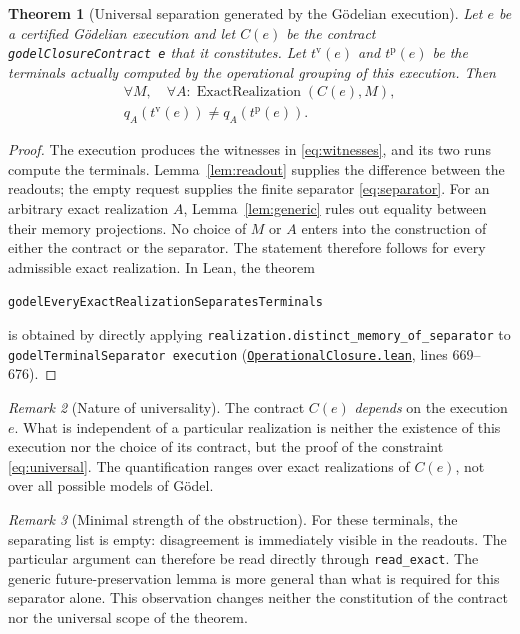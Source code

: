\documentclass[11pt,a4paper]{article}
\newcommand{\ExactRealization}{\operatorname{ExactRealization}}
\newcommand{\code}[1]{\nolinkurl{#1}}
\newcommand{\SourceAt}[3]{\href{https://github.com/JohnDoe-collab-stack/relational-perimeter/blob/1e5aeda745559d62a3819bb3213da7fce3c31ad1/#1\#L#2}{\nolinkurl{#3}}}
\newtheorem{theorem}{Theorem}[section]
\theoremstyle{remark}
\newtheorem{remark}[theorem]{Remark}
\begin{document}
\begin{theorem}[Universal separation generated by the Gödelian execution]
\label{thm:universal}
Let $e$ be a certified Gödelian execution and let $C(e)$ be the contract
\code{godelClosureContract e} that it constitutes. Let
$t^{\mathrm v}(e)$ and $t^{\mathrm p}(e)$ be the terminals actually
computed by the operational grouping of this execution. Then
\begin{equation}\label{eq:universal}
\boxed{\begin{gathered}
\forall M,\quad \forall A:\ExactRealization(C(e),M),\\
q_A(t^{\mathrm v}(e))\neq q_A(t^{\mathrm p}(e)).
\end{gathered}}
\end{equation}
\end{theorem}
\begin{proof}
The execution produces the witnesses in \eqref{eq:witnesses}, and its two
runs compute the terminals. Lemma~\ref{lem:readout} supplies the difference
between the readouts; the empty request supplies the finite separator
\eqref{eq:separator}. For an arbitrary exact realization $A$,
Lemma~\ref{lem:generic} rules out equality between their memory projections.
No choice of $M$ or $A$ enters into the construction of either the contract
or the separator. The statement therefore follows for every admissible
exact realization. In Lean, the theorem
\begin{center}
\code{godelEveryExactRealizationSeparatesTerminals}
\end{center}
is obtained by directly applying
\code{realization.distinct\_memory\_of\_separator} to
\code{godelTerminalSeparator execution}
(\SourceAt{RelationalPerimeter/Constitution/Godel/OperationalClosure.lean}{669-L676}{OperationalClosure.lean},
lines 669--676).
\end{proof}

\begin{remark}[Nature of universality]
The contract $C(e)$ \emph{depends} on the execution $e$. What is independent
of a particular realization is neither the existence of this execution nor
the choice of its contract, but the proof of the constraint
\eqref{eq:universal}. The quantification ranges over exact realizations of
$C(e)$, not over all possible models of Gödel.
\end{remark}

\begin{remark}[Minimal strength of the obstruction]
For these terminals, the separating list is empty: disagreement is
immediately visible in the readouts. The particular argument can therefore
be read directly through \code{read\_exact}. The generic future-preservation
lemma is more general than what is required for this separator alone. This
observation changes neither the constitution of the contract nor the
universal scope of the theorem.
\end{remark}
\end{document}
